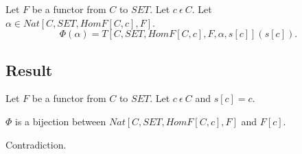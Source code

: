 \documentclass{article}
\newcommand{\inn}{~\epsilon~}
\newcommand{\innn}{~\epsilon~} %
\begin{document}
\begin{forthel}


		\begin{axiom}[PhiDef]
		Let $F$ be a functor from $C$ to $SET$. Let $c \innn C$.
		Let $\alpha \in Nat[C,SET,HomF[C,c],F]$.
		$$\Phi(\alpha) = T[C,SET,HomF[C,c],F,\alpha,s[c]](s[c]).$$
		\end{axiom}
		


	\end{forthel}
	
\subsection{Result}

	\begin{forthel}
	
		\begin{axiom}[Yoneda]
		Let $F$ be a functor from $C$ to $SET$. Let $c \innn C$ and $s[c]=c$. 
		\begin{center}
			$\Phi$ is a bijection between $Nat[C,SET,HomF[C,c],F]$ and $F[c]$.
		\end{center}							
		\end{axiom}

  \begin{lemma}
    Contradiction.
  \end{lemma}
		
	\end{forthel}
	
\end{document}

